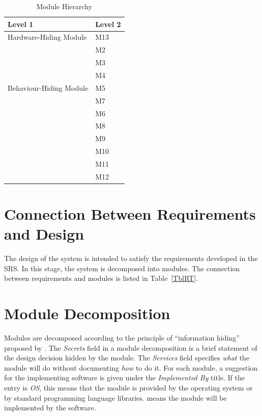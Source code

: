 \documentclass[12pt, titlepage]{article}
\begin{document}
\begin{table}[H]
\centering
\begin{tabular}{p{} p{}}
\toprule
\textbf{Level 1} & \textbf{Level 2}\\
\midrule

{Hardware-Hiding Module} & M13 \\
\midrule

\multirow{7}{0.3\textwidth}{Behaviour-Hiding Module} & M2\\
& M3\\
& M4\\
& M5\\
& M7\\
\midrule

\multirow{3}{0.3\textwidth}{Software Decision Module} & M6\\
& M8\\
& M9\\
& M10\\
& M11\\
& M12\\
\bottomrule

\end{tabular}
\caption{Module Hierarchy}
\label{TblMH}
\end{table}

\section{Connection Between Requirements and Design} \label{SecConnection}

The design of the system is intended to satisfy the requirements developed in
the SRS. In this stage, the system is decomposed into modules. The connection
between requirements and modules is listed in Table~\ref{TblRT}.

\section{Module Decomposition} \label{SecMD}

Modules are decomposed according to the principle of ``information hiding''
proposed by \citet{ParnasEtAl1984}. The \emph{Secrets} field in a module
decomposition is a brief statement of the design decision hidden by the
module. The \emph{Services} field specifies \emph{what} the module will do
without documenting \emph{how} to do it. For each module, a suggestion for the
implementing software is given under the \emph{Implemented By} title. If the
entry is \emph{OS}, this means that the module is provided by the operating
system or by standard programming language libraries.  \emph{\progname{}} means the
module will be implemented by the \progname{} software.
\end{document}
